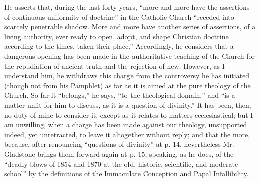 He asserts that, during the last forty years, ``more and more
have the assertions of continuous uniformity of doctrine'' in the
Catholic Church ``receded into scarcely penetrable shadow. More and
more have another series of assertions, of a living authority, ever
ready to open, adopt, and shape Christian doctrine according to the
times, taken their place.'' Accordingly, he considers that a
dangerous opening has been made in the authoritative teaching of the
Church for the repudiation of ancient truth and the rejection of new.
However, as I understand him, he withdraws this charge from the
controversy he has initiated (though not from his Pamphlet) as far as it
is aimed at the pure theology of the Church. So far it
``belongs,'' he says, ``to the theological domain,'' and
``is a matter unfit for him to discuss, as it is a question of
divinity.'' It has been, then, no duty of mine to consider it,
except as it relates to matters ecclesiastical; but I am unwilling, when
a charge has been made against our theology, unsupported indeed, yet
unretracted, to leave it altogether without reply; and that the more,
because, after renouncing ``questions of divinity'' at p. 14,
nevertheless Mr. Gladstone brings them forward again at p. 15, speaking,
as he does, of the ``deadly blows of 1854 and 1870 at the old,
historic, scientific, and moderate school'' by the definitions of
the Immaculate Conception and Papal Infallibility.

